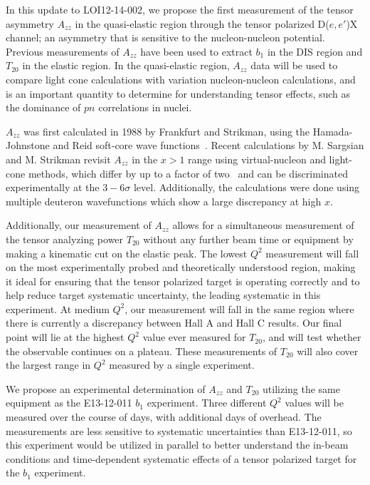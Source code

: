 In this update to LOI12-14-002, we propose the first measurement of the tensor asymmetry $A_{zz}$ in the quasi-elastic region through the tensor polarized D($e,e'$)X channel; an asymmetry that is sensitive to the nucleon-nucleon potential.  Previous measurements of $A_{zz}$ have been used to extract $b_1$ in the DIS region and $T_{20}$ in the elastic region. In the quasi-elastic region, $A_{zz}$ data will be used to compare light cone calculations with variation nucleon-nucleon calculations, and is an important quantity to determine for understanding tensor effects, such as the dominance of $pn$ correlations in nuclei.

$A_{zz}$ was first calculated in 1988 by Frankfurt and Strikman, using the Hamada-Johnstone and Reid soft-core wave functions~\cite{Frankfurt:1988nt}. Recent calculations by
M. Sargsian and M. Strikman revisit $A_{zz}$ in the $x > 1$ range using virtual-nucleon and light-cone methods, which differ by up to a factor of two~\cite{MISAK} and can be discriminated experimentally at the $3-6\sigma$ level. Additionally, the calculations were done using multiple deuteron wavefunctions which show a large discrepancy at high $x$.

Additionally, our measurement of $A_{zz}$ allows for a simultaneous measurement of the tensor analyzing power $T_{20}$ without any further beam time or equipment by making a kinematic cut on the elastic peak. The lowest $Q^2$ measurement will fall on the most experimentally probed and theoretically understood region, making it ideal for ensuring that the tensor polarized target is operating correctly and to help reduce target systematic uncertainty, the leading systematic in this experiment. At medium $Q^2$, our measurement will fall in the same region where there is currently a discrepancy between Hall A and Hall C results. Our final point will lie at the highest $Q^2$ value ever measured for $T_{20}$, and will test whether the observable continues on a plateau. These measurements of $T_{20}$ will also cover the largest range in $Q^2$ measured by a single experiment.

We propose an experimental determination of $A_{zz}$ and $T_{20}$ utilizing the same equipment as the E13-12-011 $b_1$ experiment.  Three different $Q^2$ values will be measured over the course of \productiondays days, with \overheaddays additional days of overhead. The measurements are less sensitive to systematic uncertainties than E13-12-011, so this experiment would be utilized in parallel to better understand the in-beam conditions and time-dependent systematic effects of a tensor polarized target for the $b_1$ experiment.


